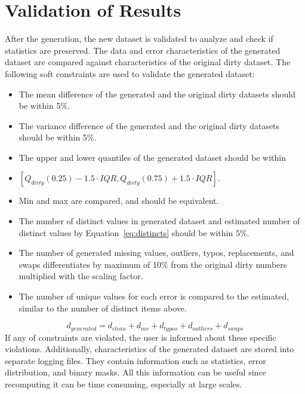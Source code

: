 \section{Validation of Results}
\label{sec:validation}
After the generation, the new dataset is validated to analyze and check if statistics are preserved. 
The data and error characteristics of the generated dataset are compared against characteristics of the original dirty dataset.
The following soft constraints are used to validate the generated dataset:
\begin{itemize}
    \item The mean difference of the generated and the original dirty datasets should be within 5\%.
    \item The variance difference of the generated and the original dirty datasets should be within 5\%.
    \item The upper and lower quantiles of the generated dataset should be within 
    \item[~]$[Q_{dirty}(0.25) - 1.5\cdot IQR, Q_{dirty}(0.75) + 1.5\cdot IQR]$.
    \item Min and max are compared, and should be equivalent.
    \item The number of distinct values in generated dataset and estimated number of distinct values by Equation~\ref{eq:distincts} should be within 5\%.
    \item The number of generated missing values, outliers, typos, replacements, and swaps differentiates by maximum  of 10\% from the original dirty numbers multiplied with the scaling factor.
    \item The number of unique values for each error is compared to the estimated, similar to the number of distinct items above.
\end{itemize}

\begin{equation}
\label{eq:distincts}
d_{generated} = d_{clean} + d_{mv} + d_{typos} + d_{outliers} + d_{swaps}
\end{equation}
If any of constraints are violated, the user is informed about these specific violations. 
Additionally, characteristics of the generated dataset are stored into separate logging files. 
They contain information such as statistics, error distribution, and binary masks.
All this information can be useful since recomputing it can be time consuming, especially at large scales.

